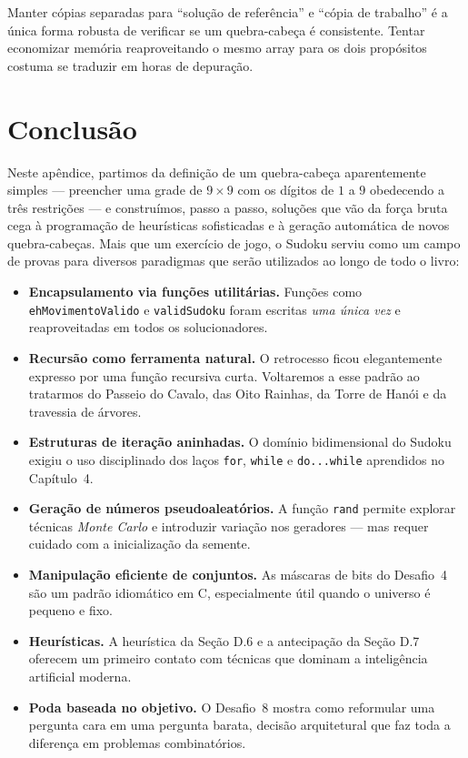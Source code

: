\documentclass[11pt,a4paper,oneside]{report}
\newcommand{\codigo}[1]{\texttt{\color{deitelblue}#1}}
\begin{document}
\begin{boapratica}
Manter cópias separadas para ``solução de referência'' e ``cópia de
trabalho'' é a única forma robusta de verificar se um quebra-cabeça é
consistente. Tentar economizar memória reaproveitando o mesmo array
para os dois propósitos costuma se traduzir em horas de depuração.
\end{boapratica}

\section{Conclusão}

Neste apêndice, partimos da definição de um quebra-cabeça aparentemente
simples --- preencher uma grade de $9 \times 9$ com os dígitos de $1$
a $9$ obedecendo a três restrições --- e construímos, passo a passo,
soluções que vão da força bruta cega à programação de heurísticas
sofisticadas e à geração automática de novos quebra-cabeças. Mais que
um exercício de jogo, o Sudoku serviu como um campo de provas para
diversos paradigmas que serão utilizados ao longo de todo o livro:

\begin{itemize}
    \item \textbf{Encapsulamento via funções utilitárias.} Funções como
        \codigo{ehMovimentoValido} e \codigo{validSudoku} foram escritas
        \emph{uma única vez} e reaproveitadas em todos os solucionadores.
    \item \textbf{Recursão como ferramenta natural.} O retrocesso ficou
        elegantemente expresso por uma função recursiva curta.
        Voltaremos a esse padrão ao tratarmos do Passeio do Cavalo, das
        Oito Rainhas, da Torre de Hanói e da travessia de árvores.
    \item \textbf{Estruturas de iteração aninhadas.} O domínio bidimensional
        do Sudoku exigiu o uso disciplinado dos laços \codigo{for},
        \codigo{while} e \codigo{do...while} aprendidos no Capítulo~4.
    \item \textbf{Geração de números pseudoaleatórios.} A função \codigo{rand}
        permite explorar técnicas \textit{Monte Carlo} e introduzir variação
        nos geradores --- mas requer cuidado com a inicialização da semente.
    \item \textbf{Manipulação eficiente de conjuntos.} As máscaras de bits
        do Desafio~4 são um padrão idiomático em C, especialmente útil
        quando o universo é pequeno e fixo.
    \item \textbf{Heurísticas.} A heurística da Seção D.6 e a antecipação
        da Seção D.7 oferecem um primeiro contato com técnicas que dominam
        a inteligência artificial moderna.
    \item \textbf{Poda baseada no objetivo.} O Desafio~8 mostra como
        reformular uma pergunta cara em uma pergunta barata, decisão
        arquitetural que faz toda a diferença em problemas combinatórios.
\end{itemize}
\end{document}
